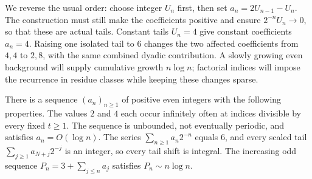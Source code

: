 We reverse the usual order: choose integer $U_n$ first, then set
$a_n=2U_{n-1}-U_n$.  The construction must still make the coefficients
positive and ensure $2^{-n}U_n\to0$, so that these are actual tails.
Constant tails $U_n=4$ give
constant coefficients $a_n=4$.  Raising one isolated tail to $6$
changes the two affected coefficients from $4,4$ to $2,8$, with the
same combined dyadic contribution.  A slowly growing even background
will supply cumulative growth $n\log n$; factorial indices will impose
the recurrence in residue classes while keeping these changes sparse.

\begin{theorem}\label{long251:res:polignacfail}
There is a sequence $(a_n)_{n\ge1}$ of positive even integers with the
following properties.  The values $2$ and $4$ each occur infinitely often at
indices divisible by every fixed $t\ge1$.  The sequence is unbounded, not
eventually periodic, and satisfies $a_n=O(\log n)$.  The series
$\sum_{n\ge1}a_n2^{-n}$ equals $6$, and every scaled tail
$\sum_{j\ge1}a_{N+j}2^{-j}$ is an integer, so every tail shift is integral.
The increasing odd sequence $P_n=3+\sum_{j\le n}a_j$ satisfies
$P_n\sim n\log n$.
\end{theorem}

